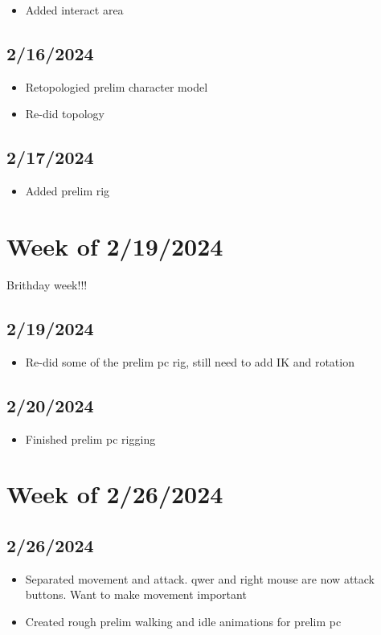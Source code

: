\documentclass{article}
\begin{document}
\begin{itemize}
   \item Added interact area
\end{itemize}

\subsection*{2/16/2024}

\begin{itemize}
   \item Retopologied prelim character model
   \item Re-did topology
\end{itemize}

\subsection*{2/17/2024}

\begin{itemize}
   \item Added prelim rig
\end{itemize}

\section*{Week of 2/19/2024}

Brithday week!!!

\subsection*{2/19/2024}
\begin{itemize}
   \item Re-did some of the prelim pc rig, still need to add IK and rotation
\end{itemize}

\subsection*{2/20/2024}
\begin{itemize}
   \item Finished prelim pc rigging
\end{itemize}

\section*{Week of 2/26/2024}
\subsection*{2/26/2024}
\begin{itemize}
   \item Separated movement and attack. qwer and right mouse are now attack buttons. Want to make movement important
   \item Created rough prelim walking and idle animations for prelim pc
\end{itemize}
\end{document}
